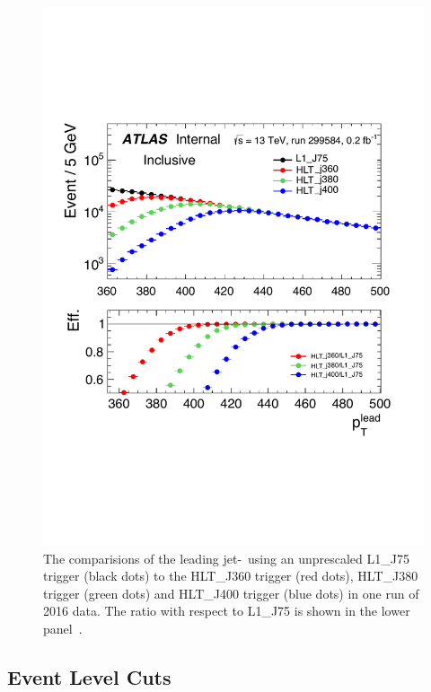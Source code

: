 \begin{figure}[!ht]
  \begin{center}
    \includegraphics[width=0.8\linewidth, angle=0]{figs/Dibjet/ICHEP/evt-jet_pt.pdf}
  \end{center}
\caption[The comparisions of the leading jet-\pT~using unprescaled L1\_J75 trigger (black dots) to the HLT\_J360 trigger (red dots),
  HLT\_J380 trigger (green dots) and HLT\_J400 trigger (blue dots) in one run of 2016 data.
  The ratio with respect to L1\_J75 is shown in the lower panel.]
        {The comparisions of the leading jet-\pT~using an unprescaled L1\_J75 trigger (black dots) to the HLT\_J360 trigger (red dots),
          HLT\_J380 trigger (green dots) and HLT\_J400 trigger (blue dots) in one run of 2016 data.
          The ratio with respect to L1\_J75 is shown in the lower panel~\cite{dibjet-ichep_conf}.}
  \label{fig:evt-jet_pt}
\end{figure}

\subsection{Event Level Cuts}
\label{sec:evt-sel-event}

